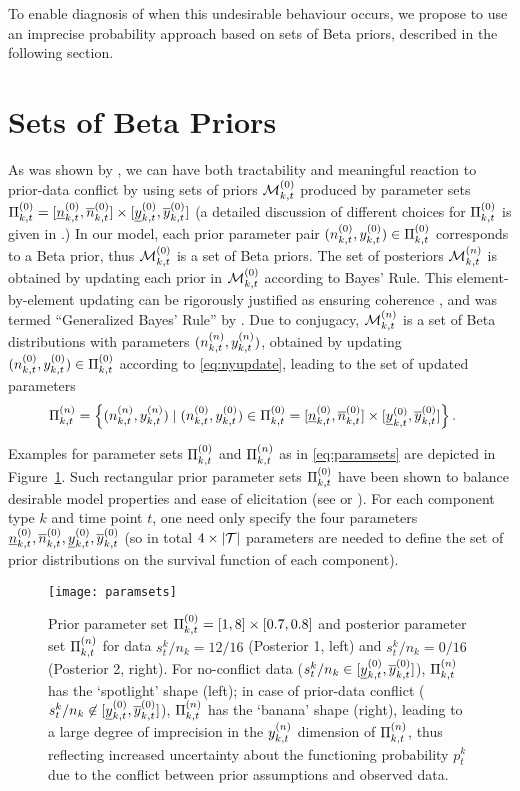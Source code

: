 \documentclass[12pt, a4paper]{elsarticle}
\begin{document}
To enable diagnosis of when this undesirable behaviour occurs,
we propose to use an imprecise probability approach
based on sets of Beta priors, described in the following section.


\section{Sets of Beta Priors}
\label{sec:setsofbetapriors}

As was shown by \citet{2009:WalterAugustin}, %
we can have both tractability and meaningful reaction to prior-data conflict
by using sets of priors $\mathcal{M}^{(0)}_{k,t}$ produced by parameter sets $\Pi^{(0)}_{k,t} = [\underline{n}^{(0)}_{k,t}, \overline{n}^{(0)}_{k,t}] \times [\underline{y}^{(0)}_{k,t}, \overline{y}^{(0)}_{k,t}]$
(a detailed discussion of different choices for $\Pi^{(0)}_{k,t}$ is given in \citet[\S 3.1]{2013:diss-gw}.)
In our model, each prior parameter pair $(n^{(0)}_{k,t}, y^{(0)}_{k,t}) \in \Pi^{(0)}_{k,t}$
corresponds to a Beta prior, thus $\mathcal{M}^{(0)}_{k,t}$ is a set of Beta priors.
The set of posteriors $\mathcal{M}^{(n)}_{k,t}$ is obtained by updating each prior in $\mathcal{M}^{(0)}_{k,t}$ according to Bayes' Rule.
This element-by-element updating can be rigorously justified
as ensuring coherence \citep[\S 2.5]{1991:walley}, and was termed ``Generalized Bayes' Rule'' by \citet[\S 6.4]{1991:walley}.
Due to conjugacy, $\mathcal{M}^{(n)}_{k,t}$ is a set of Beta distributions with parameters $(n^{(n)}_{k,t}, y^{(n)}_{k,t})$,
obtained by updating $(n^{(0)}_{k,t}, y^{(0)}_{k,t}) \in \Pi^{(0)}_{k,t}$ according to \eqref{eq:nyupdate},
leading to the set of updated parameters
\begin{align}
\Pi^{(n)}_{k,t} &= \Big\{ (n^{(n)}_{k,t}, y^{(n)}_{k,t}) \mid (n^{(0)}_{k,t}, y^{(0)}_{k,t}) \in \Pi^{(0)}_{k,t} = [\underline{n}^{(0)}_{k,t}, \overline{n}^{(0)}_{k,t}] \times [\underline{y}^{(0)}_{k,t}, \overline{y}^{(0)}_{k,t}] \Big\}\,.
\label{eq:paramsets}
\end{align}

Examples for parameter sets $\Pi^{(0)}_{k,t}$ and $\Pi^{(n)}_{k,t}$ as in \eqref{eq:paramsets} are depicted in Figure~\ref{fig:paramsets}.
Such rectangular prior parameter sets $\Pi^{(0)}_{k,t}$ have been shown
to balance desirable model properties and ease of elicitation 
(see \citet[pp.~123f]{2013:diss-gw} or \citet{Troffaes2013a-short}).
%
For each component type $k$ and time point $t$,
one need only specify the four parameters $\underline{n}^{(0)}_{k,t}, \overline{n}^{(0)}_{k,t}, \underline{y}^{(0)}_{k,t}, \overline{y}^{(0)}_{k,t}$
(so in total $4 \times |{\cal T}|$ parameters are needed to define the set of prior distributions
on the survival function of each component).

\begin{figure}
\texttt{[image: paramsets]}
\caption{Prior parameter set $\Pi^{(0)}_{k,t} = [1,8] \times [0.7,0.8]$ and posterior parameter set $\Pi^{(n)}_{k,t}$
for data $s^k_t/n_k = 12/16$ (Posterior 1, left) and $s^k_t/n_k = 0/16$ (Posterior 2, right).
For no-conflict data ($s^k_t/n_k \in [\underline{y}^{(0)}_{k,t},\overline{y}^{(0)}_{k,t}]$), $\Pi^{(n)}_{k,t}$ has the `spotlight' shape (left);
in case of prior-data conflict ($s^k_t/n_k \not\in [\underline{y}^{(0)}_{k,t},\overline{y}^{(0)}_{k,t}]$), $\Pi^{(n)}_{k,t}$ has the `banana' shape (right),
leading to a large degree of imprecision in the $y^{(n)}_{k,t}$ dimension of $\Pi^{(n)}_{k,t}$,
thus reflecting increased uncertainty about the functioning probability $p^k_t$
due to the conflict between prior assumptions and observed data.}
\label{fig:paramsets}
\end{figure}
\end{document}
